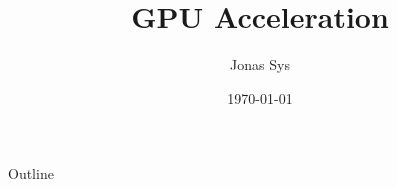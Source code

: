 \documentclass[11pt]{beamer}
\title{GPU Acceleration}
\author{Jonas Sys}
\institute{Supervisors: Prof. Christophe Scholliers, Prof. Elisa Gonzalez Boix}
\date{\today}
\begin{document}
    

    \begin{frame}
        \titlepage
    \end{frame}

    \begin{frame}{Outline}
        \tableofcontents
    \end{frame}

    
    
    
    
\end{document}
